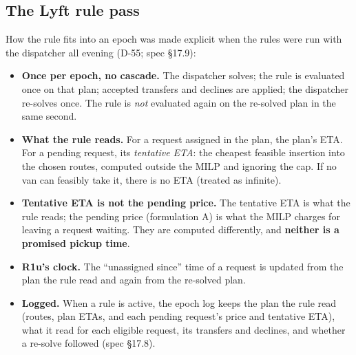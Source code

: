 \documentclass[11pt,letterpaper]{article}
\newcommand{\D}[1]{D-#1}
\begin{document}
\subsection{The Lyft rule pass}\label{sec:rulepass}
How the rule fits into an epoch was made explicit when the rules were run with the dispatcher all evening (\D{55}; spec §17.9):
\begin{itemize}
\item \textbf{Once per epoch, no cascade.} The dispatcher solves; the rule is evaluated once on that plan; accepted transfers and declines are applied; the dispatcher re-solves once. The rule is \emph{not} evaluated again on the re-solved plan in the same second.
\item \textbf{What the rule reads.} For a request assigned in the plan, the plan's ETA. For a pending request, its \emph{tentative ETA}: the cheapest feasible insertion into the chosen routes, computed outside the MILP and ignoring the cap. If no van can feasibly take it, there is no ETA (treated as infinite).
\item \textbf{Tentative ETA is not the pending price.} The tentative ETA is what the rule reads; the pending price (formulation A) is what the MILP charges for leaving a request waiting. They are computed differently, and \textbf{neither is a promised pickup time}.
\item \textbf{R1u's clock.} The ``unassigned since'' time of a request is updated from the plan the rule read and again from the re-solved plan.
\item \textbf{Logged.} When a rule is active, the epoch log keeps the plan the rule read (routes, plan ETAs, and each pending request's price and tentative ETA), what it read for each eligible request, its transfers and declines, and whether a re-solve followed (spec §17.8).
\end{itemize}
\end{document}
